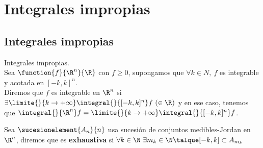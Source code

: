 \chapter{Integrales impropias}	
\section{Integrales impropias}
\begin{defi} Integrales impropias.\\
Sea $\function{f}{\R^n}{\R}$ con $f\geq 0$, supongamos que $\forall k\in N,\ f$ es integrable y acotada en $[-k,k]^n$.\\
Diremos que $f$ es integrable en $\R^n$ si $\exists\limite{}{k\to +\infty}\integral{}{[-k,k]^n}f\ (\in\R)$ y en ese caso, tenemos que $\integral{}{\R^n}f=\limite{}{k\to +\infty}\integral{}{[-k,k]^n}f$.
\end{defi}

\begin{defi} Sea $\sucesionelement{A_n}{n}$ usa sucesión de conjuntos medibles-Jordan en $\R^n$, diremos que es \textbf{exhaustiva} si $\forall k\in\N\ \exists m_k\in\N\talque[-k,k]\subset A_{m_k}$
\end{defi}

